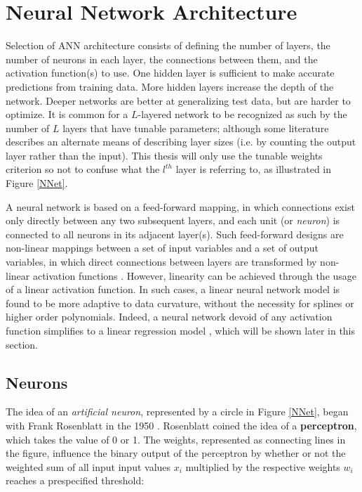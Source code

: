
\section{Neural Network Architecture} %

Selection of ANN architecture consists of defining the number of layers, the number of neurons in each layer, the connections between them, and the activation function(s) to use. One hidden layer is sufficient to make accurate predictions from training data. More hidden layers increase the depth of the network. Deeper networks are better at generalizing test data, but are harder to optimize. \cite{Goodfellow-et-al-2016} 
It is common for a $L$-layered network to be recognized as such by the number of $L$ layers that have tunable parameters; although some literature describes an alternate means of describing layer sizes \cite{bishop1995} (i.e. by counting the output layer rather than the input).  This thesis will only use the tunable weights criterion so not to confuse what the $l^{th}$ layer is referring to, as illustrated in Figure \ref{NNet}.  

A neural network is based on a feed-forward mapping, in which connections exist only directly between any two subsequent layers, and each unit (or \textit{neuron}) is connected to all neurons in its adjacent layer(s).  Such feed-forward designs are non-linear mappings between a set of input variables and a set of output variables, in which direct connections between layers are transformed by non-linear activation functions \cite{bishop2006pattern}.
However, linearity can be achieved through the usage of a linear activation function.  In such cases, a linear neural network model is found to be more adaptive to data curvature, without the necessity for splines or higher order polynomials. Indeed, a neural network devoid of any activation function simplifies to a linear regression model \cite{sharma2017activation}, which will be shown later in this section.

\hypertarget{foundations}{%
\subsection{Neurons}\label{foundations}}

The idea of an \textit{artificial neuron}, represented by a circle in Figure \ref{NNet}, began with Frank Rosenblatt in the 1950 \cite{nielsen}.  Rosenblatt coined the idea of a \textbf{perceptron}, which takes the value of 0 or 1.  The weights, represented as connecting lines in the figure, influence the binary output of the perceptron by whether or not the weighted sum of all input input values $x_i$ multiplied by the respective weights $w_i$ reaches a prespecified threshold:

